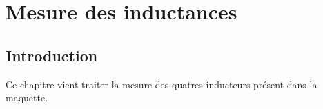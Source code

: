 \chapter{Mesure des inductances}

\section{Introduction}
Ce chapitre vient traiter la mesure des quatres inducteurs présent dans la maquette.